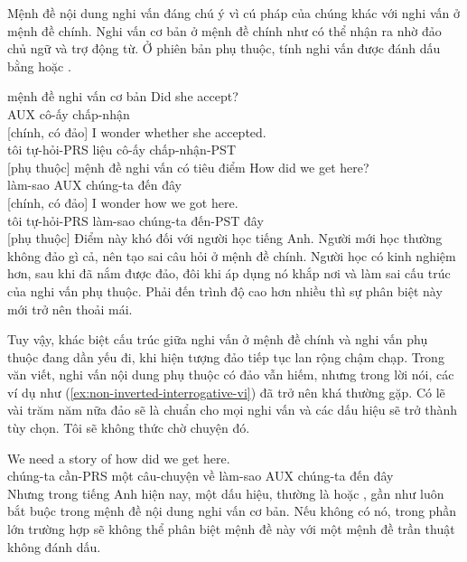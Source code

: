 \label{sec:sub-interrog-vi}

Mệnh đề nội dung nghi vấn đáng chú ý vì cú pháp của chúng khác với nghi vấn ở mệnh đề chính. Nghi vấn cơ bản ở mệnh đề chính như  có thể nhận ra nhờ đảo chủ ngữ và trợ động từ. Ở phiên bản phụ thuộc, tính nghi vấn được đánh dấu bằng  hoặc .

\ea mệnh đề nghi vấn cơ bản\label{ex:int-sub-vi}
    \ea \gll Did she accept?\\
        AUX cô-ấy chấp-nhận\\
    \glt {} [chính, có đảo]
    \ex \gll I wonder {\ob}whether she accepted{\cb}.\\
        tôi tự-hỏi-PRS liệu cô-ấy chấp-nhận-PST\\
    \glt {} [phụ thuộc]
    \z
\z
\ea mệnh đề nghi vấn có tiêu điểm
    \ea \gll How did we get here?\\
        làm-sao AUX chúng-ta đến đây\\
    \glt {} [chính, có đảo]
    \ex \gll I wonder {\ob}how we got here{\cb}.\\
        tôi tự-hỏi-PRS làm-sao chúng-ta đến-PST đây\\
    \glt {} [phụ thuộc]
    \z
\z
Điểm này khó đối với người học tiếng Anh. Người mới học thường không đảo gì cả, nên tạo sai câu hỏi ở mệnh đề chính. Người học có kinh nghiệm hơn, sau khi đã nắm được đảo, đôi khi áp dụng nó khắp nơi và làm sai cấu trúc của nghi vấn phụ thuộc. Phải đến trình độ cao hơn nhiều thì sự phân biệt này mới trở nên thoải mái.

Tuy vậy, khác biệt cấu trúc giữa nghi vấn ở mệnh đề chính và nghi vấn phụ thuộc đang dần yếu đi, khi hiện tượng đảo tiếp tục lan rộng chậm chạp. Trong văn viết, nghi vấn nội dung phụ thuộc có đảo vẫn hiếm, nhưng trong lời nói, các ví dụ như (\ref{ex:non-inverted-interrogative-vi}) đã trở nên khá thường gặp. Có lẽ vài trăm năm nữa đảo sẽ là chuẩn cho mọi nghi vấn và các dấu hiệu sẽ trở thành tùy chọn. Tôi sẽ không thức chờ chuyện đó.

\ea\label{ex:non-inverted-interrogative-vi}
\gll We need a story of {\ob}how did we get here{\cb}.\\
    chúng-ta cần-PRS một câu-chuyện về làm-sao AUX chúng-ta đến đây\\
\glt {}
\z
Nhưng trong tiếng Anh hiện nay, một dấu hiệu, thường là  hoặc , gần như luôn bắt buộc trong mệnh đề nội dung nghi vấn cơ bản. Nếu không có nó, trong phần lớn trường hợp sẽ không thể phân biệt mệnh đề này với một mệnh đề trần thuật không đánh dấu.

